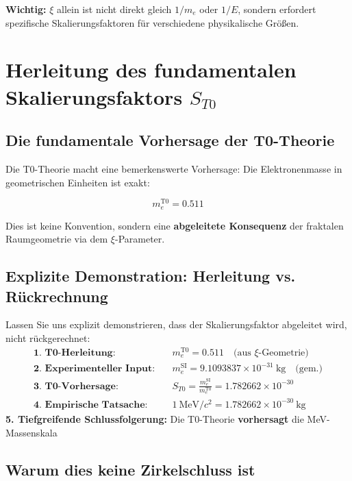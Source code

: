 	\textbf{Wichtig:} $\xi$ allein ist nicht direkt gleich $1/m_e$ oder $1/E$, sondern erfordert spezifische Skalierungsfaktoren für verschiedene physikalische Größen.
	
	\section{Herleitung des fundamentalen Skalierungsfaktors $S_{T0}$}
	\label{sec:scaling-derivation}
	
	\subsection{Die fundamentale Vorhersage der T0-Theorie}
	
	Die T0-Theorie macht eine bemerkenswerte Vorhersage: Die Elektronenmasse in geometrischen Einheiten ist exakt:
	
	\begin{equation}
		m_e^{\mathrm{T0}} = 0.511
	\end{equation}
	
	Dies ist keine Konvention, sondern eine \textbf{abgeleitete Konsequenz} der fraktalen Raumgeometrie via dem $\xi$-Parameter.
	
	\subsection{Explizite Demonstration: Herleitung vs. Rückrechnung}
	
	Lassen Sie uns explizit demonstrieren, dass der Skalierungsfaktor abgeleitet wird, nicht rückgerechnet:
\begin{align}
	\textbf{1. T0-Herleitung:} \quad & m_e^{\mathrm{T0}} = 0.511 \quad \text{(aus $\xi$-Geometrie)} \\
	\textbf{2. Experimenteller Input:} \quad & m_e^{\mathrm{SI}} = 9.1093837 \times 10^{-31}~\mathrm{kg} \quad \text{(gem.)} \\
	\textbf{3. T0-Vorhersage:} \quad & S_{T0} = \frac{m_e^{\mathrm{SI}}}{m_e^{\mathrm{T0}}} = 1.782662 \times 10^{-30} \\
	\textbf{4. Empirische Tatsache:} \quad & 1~\mathrm{MeV}/c^2 = 1.782662 \times 10^{-30}~\mathrm{kg}
\end{align}
\textbf{5. Tiefgreifende Schlussfolgerung:} Die T0-Theorie \textbf{vorhersagt} die MeV-Massenskala
	
	\subsection{Warum dies keine Zirkelschluss ist}
	
